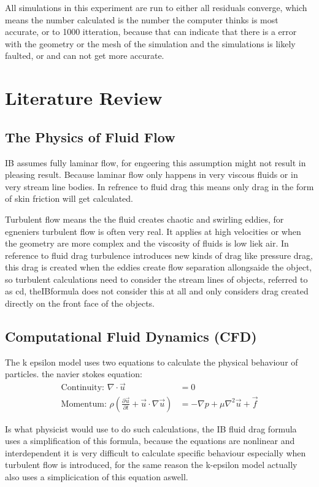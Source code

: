 \documentclass[12pt,a4paper]{article}
\begin{document}
All simulations in this experiment are run to either all residuals converge, which means the number calculated is the number the computer thinks is most accurate, or to 1000 itteration, because that can indicate that there is a error with the geometry or the mesh of the simulation and the simulations is likely faulted, or and can not get more accurate.


\section{Literature Review}

\subsection{The Physics of Fluid Flow}

IB assumes fully laminar flow, for engeering this assumption might not result in pleasing result. Because laminar flow only happens in very viscous fluids or in very stream line bodies. In refrence to fluid drag this means only drag in the form of skin friction will get calculated.

Turbulent flow means the the fluid creates chaotic and swirling eddies, for egneniers turbulent flow is often very real. It applies at high velocities or when the geometry are more complex and the viscosity of fluids is low liek air. In reference to fluid drag turbulence introduces new kinds of drag like pressure drag, this drag is created when the eddies create flow separation allongsaide the object, so turbulent calculations need to consider the stream lines of objects, referred to as cd, theIBformula does not consider this at all and only considers drag created directly on the front face of the objects. 

\subsection{Computational Fluid Dynamics (CFD)}

The k epsilon model uses two equations to calculate the physical behaviour of particles.
the navier stokes equation: 
\begin{align}
\text{Continuity: } \nabla \cdot \vec{u} &= 0\\
\text{Momentum: } \rho\left(\frac{\partial \vec{u}}{\partial t} + \vec{u} \cdot \nabla \vec{u}\right) &= -\nabla p + \mu \nabla^2 \vec{u} + \vec{f}
\end{align}

Is what physicist would use to do such calculations, the IB fluid drag formula uses a simplification of this formula, because the equations are nonlinear and interdependent it is very difficult to calculate specific behaviour especially when turbulent flow is introduced, for the same reason the k-epsilon model actually also uses a simplicication of this equation aswell.
\end{document}
